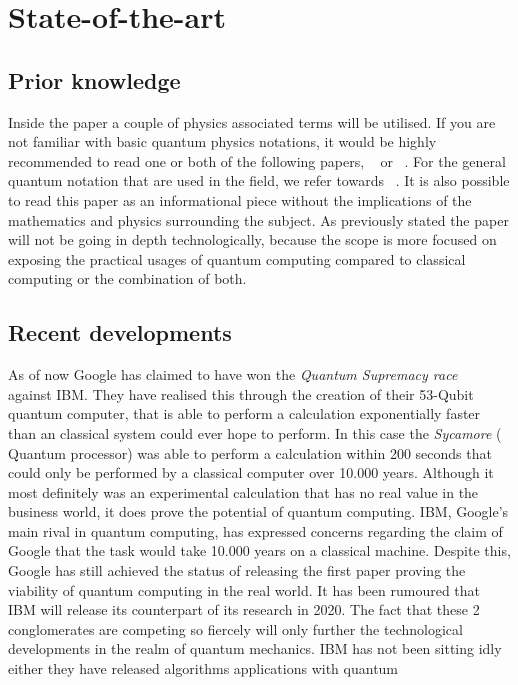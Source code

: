 
\section{State-of-the-art}
\label{sec:state-of-the-art}
\subsection{Prior knowledge}
Inside the paper a couple of physics associated terms will be utilised. If you are not familiar with basic quantum physics notations, it would be highly recommended to read one or both of the following papers, ~\textcite{Rieffel1998} or ~\textcite{Shor2000}. For the general quantum notation that are used in the field, we refer towards ~\textcite{Dirac1939}. It is also possible to read this paper as an informational piece without the implications of the mathematics and physics surrounding the subject. As previously stated the paper will not be going in depth technologically, because the scope is more focused on exposing the practical usages of quantum computing compared to classical computing or the combination of both.

\subsection{Recent developments}

As of now Google has claimed to have won the \emph{Quantum Supremacy race} ~\autocite{Google2019} against IBM. They have realised this through the creation of their 53-Qubit quantum computer, that is able to perform a calculation exponentially faster than an classical system could ever hope to perform. In this case the \emph{Sycamore} ( Quantum processor) was able to perform a calculation within 200 seconds that could only be performed by a classical computer over 10.000 years. Although it most definitely was an experimental calculation that has no real value in the business world, it does prove the potential of quantum computing. IBM, Google's main rival in quantum computing, has expressed concerns regarding the claim of Google that the task would take 10.000 years on a classical machine. Despite this, Google has still achieved the status of releasing the first paper proving the viability of quantum computing in the real world. It has been rumoured that IBM will release its counterpart of its research in 2020. The fact that these 2 conglomerates are competing so fiercely will only further the technological developments in the realm of quantum mechanics. IBM has not been sitting idly either they have released algorithms applications with quantum \autocite{IBM2019}


